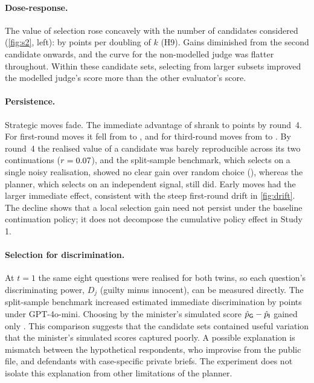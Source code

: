 \paragraph{Dose-response.}
The value of selection rose concavely with the number of candidates considered (\cref{fig:s2}, left): by
\HNineImmediate{} points per doubling of $k$ (H9). Gains diminished from the second candidate onwards, and the curve
for the non-modelled judge was flatter throughout. Within these candidate sets, selecting from larger subsets improved the modelled judge's score more than
the other evaluator's score.

\paragraph{Persistence.}
Strategic moves fade. The immediate advantage of \HSevenImmediate{} shrank to \HSevenFinal{} points by round~4. For
first-round moves it fell from \PersistOneImm{} to \PersistOneFin{}, and for third-round moves from \PersistThreeImm{}
to \PersistThreeFin{}. By round~4 the realised value of a candidate was barely reproducible across its two
continuations ($r=0.07$), and the split-sample benchmark, which selects on a single noisy realisation, showed no clear gain over random choice
(\SelOracleFinal{}), whereas the planner, which selects on an independent signal, still did. Early moves had the larger immediate effect, consistent with the steep first-round drift in \cref{fig:drift}.
The decline shows that a local selection gain need not persist under the baseline continuation policy; it does not
decompose the cumulative policy effect in Study 1.

\paragraph{Selection for discrimination.}
At $t=1$ the same eight questions were realised for both twins, so each question's discriminating power, $D_j$
(guilty minus innocent), can be measured directly. The split-sample benchmark increased estimated immediate discrimination by \DiscSplitOracleA{} points under GPT-4o-mini. Choosing by the minister's
simulated score $\hat p_{\mathsf{G}}-\hat p_{\mathsf{I}}$ gained only \DiscMinPickA{}. This comparison suggests that the candidate sets contained useful variation that the minister's simulated
scores captured poorly. A possible explanation is mismatch between the hypothetical respondents, who improvise
from the public file, and defendants with case-specific private briefs. The experiment does not isolate this
explanation from other limitations of the planner.
